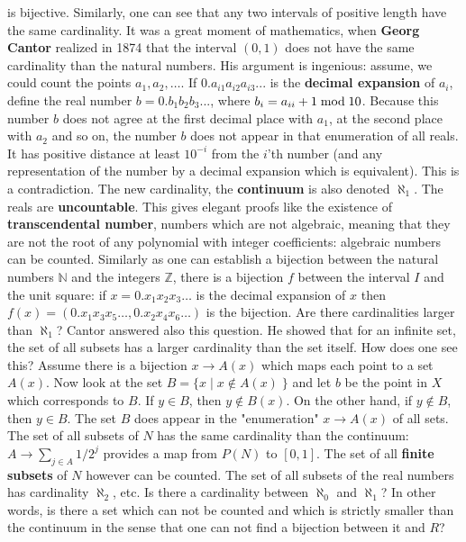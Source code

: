 \documentclass[12pt]{amsart}
\begin{document}
is bijective. Similarly, one can see that any two intervals of positive length
have the same cardinality. 
It was a great moment of mathematics, when {\bf Georg Cantor} realized in 1874 that the interval 
$(0,1)$ does not have the same cardinality than the natural numbers. His argument is ingenious:
assume, we could count the points $a_1,a_2, \dots$. If $0.a_{i1} a_{i2} a_{i3} ... $ 
is the {\bf decimal expansion} of $a_i$, define the real number 
$b = 0.b_1 b_2 b_3 ...$, where $b_i = a_{ii}+1 \; {\rm mod} \; 10$. 
Because this number $b$ does not agree at the first decimal place with $a_1$, 
at the second place with $a_2$ and so on, the number $b$ does not appear in that 
enumeration of all reals. 
It has positive distance at least $10^{-i}$ from the $i$'th number 
(and any representation of the number by a decimal expansion which is equivalent). 
This is a contradiction.  The new cardinality, the {\bf continuum} 
is also denoted $\aleph_1$.  
The reals are {\bf uncountable}. This gives elegant proofs like the existence of 
{\bf transcendental number}, numbers which are not algebraic, meaning that they are
not the root of any polynomial with integer coefficients: algebraic numbers can be counted. 
Similarly as one can establish a bijection between the natural numbers $\mathbb{N}$ 
and the integers $\mathbb{Z}$, there is a bijection
$f$ between the interval $I$ and the unit square: 
if $x = 0.x_1 x_2 x_3 \dots $ is the decimal expansion of $x$ then 
$f(x) = (0.x_1 x_3 x_5 \dots,0.x_2 x_4 x_6 \dots)$ is the bijection. 
Are there cardinalities larger than $\aleph_1$? 
Cantor answered also this question. He showed that for an infinite set, the set of all subsets has a 
larger cardinality than the set itself. 
How does one see this? Assume there is a bijection $x \to A(x)$ which maps each 
point to a set $A(x)$. Now look at the set
 $B = \{ x \; | \; x \notin A(x) \; \}$ and let $b$ be the point in $X$ which corresponds
to $B$. If $y \in B$, then $y \notin B(x)$. 
On the other hand, if $y \notin B$, then $y \in B$. The set $B$ does appear in the
"enumeration" $x \to A(x)$ of all sets. The set of all subsets of $N$ has the same cardinality than
the continuum: $A \to \sum_{j \in A} 1/2^j$ provides a map from $P(N)$ to $[0,1]$. The set of all {\bf finite subsets} of $N$ 
however can be counted. The set of all subsets of the real numbers has cardinality $\aleph_2$, etc. 
Is there a cardinality between $\aleph_0$ and $\aleph_1$? In other words, is there a set which can not be 
counted and which is strictly smaller than the continuum in the sense that one can not find a bijection between it and $R$? 
\end{document}
